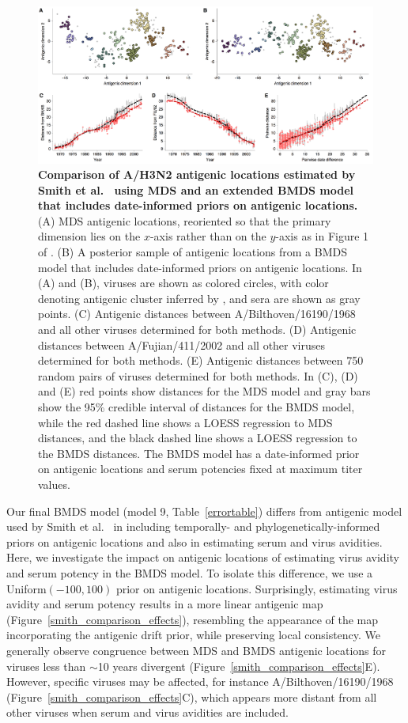\documentclass[11pt,oneside,letterpaper]{article}
\begin{document}
\begin{figure}[h]
	\centering		
	\includegraphics[width=1.0\textwidth]{figures/smith_comparison_drift}
	\caption{\textbf{Comparison of A/H3N2 antigenic locations estimated by Smith et al.\ \cite{Smith04} using MDS and an extended BMDS model that includes date-informed priors on antigenic locations.} 
	(A) MDS antigenic locations, reoriented so that the primary dimension lies on the $x$-axis rather than on the $y$-axis as in Figure 1 of \cite{Smith04}.
	(B) A posterior sample of antigenic locations from a BMDS model that includes date-informed priors on antigenic locations.
	In (A) and (B), viruses are shown as colored circles, with color denoting antigenic cluster inferred by \cite{Smith04}, and sera are shown as gray points.
	(C) Antigenic distances between A/Bilthoven/16190/1968 and all other viruses determined for both methods.
	(D) Antigenic distances between A/Fujian/411/2002 and all other viruses determined for both methods.
	(E) Antigenic distances between 750 random pairs of viruses determined for both methods.	
	In (C), (D) and (E) red points show distances for the MDS model and gray bars show the 95\% credible interval of distances for the BMDS model, while the red dashed line shows a LOESS regression to MDS distances, and the black dashed line shows a LOESS regression to the BMDS distances.
	The BMDS model has a date-informed prior on antigenic locations and serum potencies fixed at maximum titer values. 	
	} 
	\label{smith_comparison_drift} 
\end{figure}

Our final BMDS model (model 9, Table~\ref{errortable}) differs from antigenic model used by Smith et al.\ \cite{Smith04} in including temporally- and phylogenetically-informed priors on antigenic locations and also in estimating serum and virus avidities.
Here, we investigate the impact on antigenic locations of estimating virus avidity and serum potency in the BMDS model.
To isolate this difference, we use a Uniform$(-100,100)$ prior on antigenic locations.
Surprisingly, estimating virus avidity and serum potency results in a more linear antigenic map (Figure~\ref{smith_comparison_effects}), resembling the appearance of the map incorporating the antigenic drift prior, while preserving local consistency.
We generally observe congruence between MDS and BMDS antigenic locations for viruses less than $\sim$10 years divergent (Figure~\ref{smith_comparison_effects}E).
However, specific viruses may be affected, for instance A/Bilthoven/16190/1968 (Figure~\ref{smith_comparison_effects}C), which appears more distant from all other viruses when serum and virus avidities are included.
\end{document}

